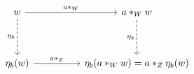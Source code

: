 \[\begin{tikzcd}
	w && {a *_{W} w} \\
	\\
	{\eta_{b}(w)} && {\eta_{b}(a *_{W} w) = a *_{Z} \eta_{b}(w)}
	\arrow["{a *_{W}}", from=1-1, to=1-3]
	\arrow["{a *_{Z}}", from=3-1, to=3-3]
	\arrow["{\eta_{b}}"', dashed, from=1-3, to=3-3]
	\arrow["{\eta_{b}}"', dashed, from=1-1, to=3-1]
\end{tikzcd}\]